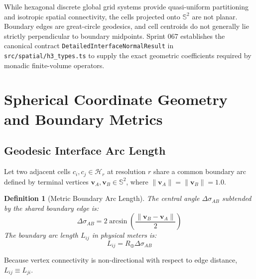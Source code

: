 \documentclass[11pt,a4paper]{article}
\newtheorem{definition}{Definition}
\begin{document}
While hexagonal discrete global grid systems provide quasi-uniform partitioning and isotropic spatial connectivity, the cells projected onto $\mathbb{S}^2$ are not planar. Boundary edges are great-circle geodesics, and cell centroids do not generally lie strictly perpendicular to boundary midpoints. Sprint 067 establishes the canonical contract \texttt{DetailedInterfaceNormalResult} in \texttt{src/spatial/h3\_types.ts} to supply the exact geometric coefficients required by monadic finite-volume operators.

\section{Spherical Coordinate Geometry and Boundary Metrics}

\subsection{Geodesic Interface Arc Length}
Let two adjacent cells $c_i, c_j \in \mathcal{H}_r$ at resolution $r$ share a common boundary arc defined by terminal vertices $\mathbf{v}_A, \mathbf{v}_B \in \mathbb{S}^2$, where $\|\mathbf{v}_A\| = \|\mathbf{v}_B\| = 1.0$.

\begin{definition}[Metric Boundary Arc Length]
The central angle $\Delta \sigma_{AB}$ subtended by the shared boundary edge is:
\begin{equation}
  \Delta \sigma_{AB} = 2 \arcsin\left(\frac{\|\mathbf{v}_B - \mathbf{v}_A\|}{2}\right)
\end{equation}
The boundary arc length $L_{ij}$ in physical meters is:
\begin{equation}
  L_{ij} = R_{\oplus} \Delta \sigma_{AB}
\end{equation}
\end{definition}
Because vertex connectivity is non-directional with respect to edge distance, $L_{ij} \equiv L_{ji}$.
\end{document}
